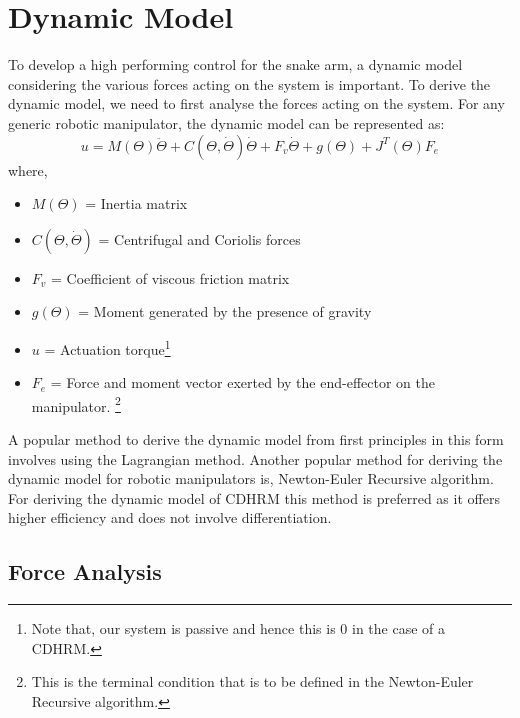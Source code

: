 \documentclass[a4paper,12pt]{report}
\begin{document}
\section{Dynamic Model}
To develop a high performing control for the snake arm, a dynamic model considering the various forces acting on the system is important. To derive the dynamic model, we need to first analyse the forces acting on the system. For any generic robotic manipulator, the dynamic model can be represented as:
\begin{equation}
\label{general-robot-dynamic-eqn}
u = M\left(\Theta\right)\ddot{\Theta} + C(\Theta,\dot{\Theta})\dot{\Theta}+ F_v\dot{\Theta} + g\left(\Theta\right) + J^{T}\left(\Theta\right)F_e
\end{equation}
where, \\
\begin{itemize}
	\renewcommand\labelitemi{--}
	\item $M\left(\Theta\right)$ = Inertia matrix
	\item $C(\Theta,\dot{\Theta})$ = Centrifugal and Coriolis forces
	\item $F_v$ = Coefficient of viscous friction matrix
	\item $g(\Theta)$ = Moment generated by the presence of gravity
	\item $u$ = Actuation torque\footnote{Note that, our system is passive and hence this is 0 in the case of a CDHRM.}
	\item $F_e$ = Force and moment vector exerted by the end-effector on the manipulator. \footnote{This is the terminal condition that is to be defined in the Newton-Euler Recursive algorithm.}
\end{itemize}
A popular method to derive the dynamic model from first principles in this form involves using the Lagrangian method. Another popular method for deriving the dynamic model for robotic manipulators is, Newton-Euler Recursive algorithm. For deriving the dynamic model of CDHRM this method is preferred as it offers higher efficiency \cite{RN30} and does not involve differentiation. 

\subsection{Force Analysis}
\end{document}
